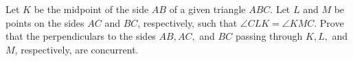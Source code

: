 Let $ K $ be the midpoint of the side $ AB $ of a given triangle $ ABC $. Let $ L $ and $ M$ be points on the sides $ AC $ and $ BC$,  respectively, such that $ \angle CLK = \angle KMC $. Prove that the perpendiculars to the sides $ AB, AC, $ and $ BC $ passing through $ K,L, $ and $M$,  respectively, are concurrent.
